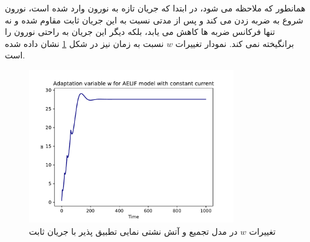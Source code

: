 \documentclass{article}
\begin{document}
                همانطور که ملاحظه می شود، در ابتدا که جریان تازه به نورون وارد شده است، نورون شروع به ضربه زدن می کند و پس از مدتی نسبت به این جریان ثابت مقاوم شده و نه تنها فرکانس ضربه ها کاهش می یابد، بلکه دیگر این جریان به راحتی نورون را برانگیخته نمی کند.
                نمودار تغییرات 
                $w$ 
                نسبت به زمان نیز در شکل 
                \ref{fig:aelif-w-const-curr}
                نشان داده شده است.
                \begin{figure}[H]
                    \centering
                    \includegraphics[width=0.8\textwidth]{plots/Adaptation variable w for AELIF model with constant current.pdf} 
                    \caption{تغییرات $w$ در مدل تجمیع و آتش نشتی نمایی تطبیق پذیر با جریان ثابت}
                    \label{fig:aelif-w-const-curr}
                \end{figure}
                
\end{document}
